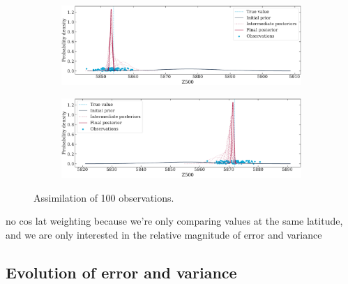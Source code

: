\documentclass[parskip=half,DIV=12]{scrartcl}
\begin{document}
\begin{figure}[h]
   \centering

   \begin{subfigure}[c]{\textwidth}
      \includegraphics[width=\textwidth]{figures/multiple_point1_var10.pdf}
   \end{subfigure}
    
   \bigskip
    
   \begin{subfigure}[c]{\textwidth}
      \includegraphics[width=\textwidth]{figures/multiple_point2_var10.pdf}
   \end{subfigure}

   \caption{Assimilation of 100 observations.}
\end{figure}


no cos lat weighting because we're only comparing values at the same latitude, and we are only interested in the relative magnitude of error and variance



\subsection{Evolution of error and variance}
\end{document}
